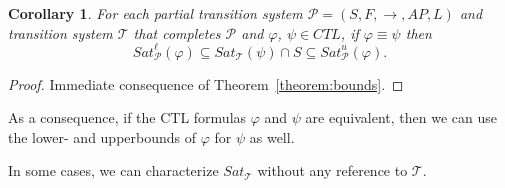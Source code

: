 \documentclass[12pt]{article}
\newtheorem{corollary}{Corollary}
\theoremstyle{definition}
\begin{document}
\begin{corollary}
For each partial transition system $\mathcal{P} = (S, F, \rightarrow, \mathit{AP}, L)$ and transition system $\mathcal{T}$ that completes $\mathcal{P}$ and $\varphi$, $\psi \in \mathit{CTL}$, if $\varphi \equiv \psi$ then
\[
\mathit{Sat}^{\ell}_{\mathcal{P}}(\varphi)
\subseteq \mathit{Sat}_{\mathcal{T}}(\psi) \cap S
\subseteq \mathit{Sat}^u_{\mathcal{P}}(\varphi).
\]
\end{corollary}
\begin{proof}
Immediate consequence of Theorem~\ref{theorem:bounds}.
\end{proof}

As a consequence, if the CTL formulas $\varphi$ and $\psi$ are equivalent, then we can use the lower- and upperbounds of $\varphi$ for $\psi$ as well.

In some cases, we can characterize $\mathit{Sat}_{\mathcal{T}}$ without any reference to $\mathcal{T}$.
\end{document}
